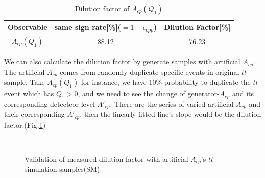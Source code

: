			\begin{center}
			\setlength{\tabcolsep}{12pt}
			\begin{longtable}{ c | c c }
			\caption{Dilution factor of $A_{cp}(Q_1)$}\\
			\hline
			Observable & same sign rate[\%]($=1-\epsilon_{opp}$) & Dilution Factor[\%] \\
			\hline
			$A_{cp}(Q_1)$ & 88.12  &  76.23  \\
			\hline
			\end{longtable}
			\label{Obs:tb:SM_DF}
			\end{center}

			We can also calculate the dilution factor by generate samples with artificial $A_{cp}$. The artificial $A_{cp}$ comes from randomly duplicate specific events in original $t\bar{t}$ sample. Take $A_{cp}(Q_1)$ for instance, we have $10\%$ probability to duplicate the $t\bar{t}$ event which has $Q_1 > 0$, and we need to see the change of generator-$A_{cp}$ and its corresponding detecteor-level $A'_{cp}$. There are the series of varied artificial $A_{cp}$ and their corresponding $A'_{cp}$, then the linearly fitted line's slope would be the dilution factor.(Fig.\ref{Obs:fig:vali_SM})

			\begin{figure}[H]
			\centering
			    \\
			\caption{Validation of measured dilution factor with artificial $A_{cp}$'s $t\bar{t}$ simulation samples(SM)}
			\label{Obs:fig:vali_SM}
			\end{figure}
			\FloatBarrier

